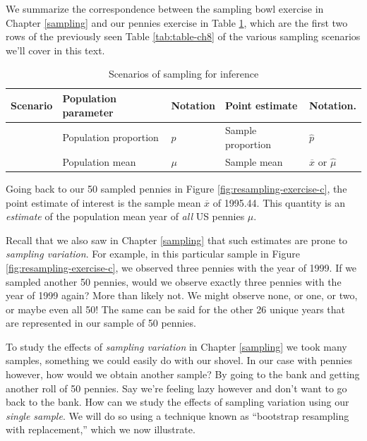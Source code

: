\documentclass[
]{book}
\begin{document}
We summarize the correspondence between the sampling bowl exercise in Chapter \ref{sampling} and our pennies exercise in Table \ref{tab:table-ch8-b}, which are the first two rows of the previously seen Table \ref{tab:table-ch8} of the various sampling scenarios we'll cover in this text.

\begin{table}[!h]

\caption{\label{tab:table-ch8-b}Scenarios of sampling for inference}
\centering
\fontsize{10}{12}\selectfont
\begin{tabular}[t]{>{\raggedleft\arraybackslash}p{0.5in}>{\raggedright\arraybackslash}p{0.7in}>{\raggedright\arraybackslash}p{1in}>{\raggedright\arraybackslash}p{1.1in}>{\raggedright\arraybackslash}p{1in}}
\toprule
Scenario & Population parameter & Notation & Point estimate & Notation.\\
\midrule
1 & Population proportion & $p$ & Sample proportion & $\widehat{p}$\\
2 & Population mean & $\mu$ & Sample mean & $\overline{x}$ or $\widehat{\mu}$\\
\bottomrule
\end{tabular}
\end{table}

Going back to our 50 sampled pennies in Figure \ref{fig:resampling-exercise-c}, the point estimate of interest is the sample mean \(\overline{x}\) of 1995.44. This quantity is an \emph{estimate} of the population mean year of \emph{all} US pennies \(\mu\).

Recall that we also saw in Chapter \ref{sampling} that such estimates are prone to \emph{sampling variation}. For example, in this particular sample in Figure \ref{fig:resampling-exercise-c}, we observed three pennies with the year of 1999. If we sampled another 50 pennies, would we observe exactly three pennies with the year of 1999 again? More than likely not. We might observe none, or one, or two, or maybe even all 50! The same can be said for the other 26 unique years that are represented in our sample of 50 pennies.

To study the effects of \emph{sampling variation} in Chapter \ref{sampling} we took many samples, something we could easily do with our shovel. In our case with pennies however, how would we obtain another sample? By going to the bank and getting another roll of 50 pennies. Say we're feeling lazy however and don't want to go back to the bank. How can we study the effects of sampling variation using our \emph{single sample}. We will do so using a technique known as ``bootstrap resampling with replacement,'' which we now illustrate.
\end{document}
